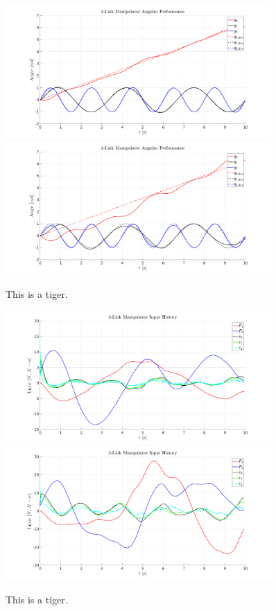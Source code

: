 \documentclass[letterpaper, 10 pt, conference]{ieeeconf}  %
\begin{document}
\begin{figure}[h!]
	\centering
	\includegraphics[width=0.9\textwidth]{pd_ang_1.png}
	\includegraphics[width=0.9\textwidth]{pd_ang_2.png}
	\caption{This is a tiger.}
\end{figure}

\begin{figure}[h!]
	\centering
	\includegraphics[width=0.9\textwidth]{pd_u_1.png}
	\includegraphics[width=0.9\textwidth]{pd_u_2.png}
	\caption{This is a tiger.}
\end{figure}
\end{document}
